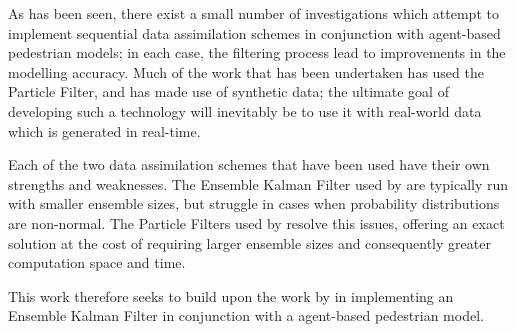 

As has been seen, there exist a small number of investigations which attempt to
implement sequential data assimilation schemes in conjunction with agent-based
pedestrian models; in each case, the filtering process lead to improvements in
the modelling accuracy.
Much of the work that has been undertaken has used the Particle Filter, and has
made use of synthetic data; the ultimate goal of developing such a technology
will inevitably be to use it with real-world data which is generated in
real-time.

Each of the two data assimilation schemes that have been used have their own
strengths and weaknesses.
The Ensemble Kalman Filter used by \citet{ward2016dynamic} are typically run
with smaller ensemble sizes, but struggle in cases when probability
distributions are non-normal. 
The Particle Filters used by \citet{wang2013data, rai2013behavior,
wang2015data} resolve this issues, offering an exact solution at the cost of
requiring larger ensemble sizes and consequently greater computation space and
time.

This work therefore seeks to build upon the work by \citet{ward2016dynamic} in
implementing an Ensemble Kalman Filter in conjunction with a agent-based
pedestrian model.

